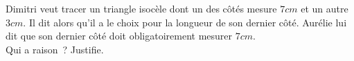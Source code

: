 %
%
Dimitri veut tracer un triangle isocèle dont un des côtés mesure $7cm$ et un autre $3cm$. Il dit alors qu'il a le choix pour la longueur de son dernier côté. Aurélie lui dit que son dernier côté doit obligatoirement mesurer $7cm$. \\
  Qui a raison~? Justifie.
